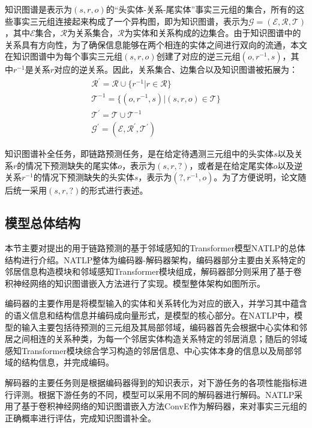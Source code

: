 知识图谱是表示为$(s,r,o)$的“头实体-关系-尾实体”事实三元组的集合，所有的这些事实三元组连接起来构成了一个异构图，即为知识图谱，表示为$\mathcal{G} = (\mathcal{E}, \mathcal{R}, \mathcal{T})$，其中$\mathcal{E}$集合，$\mathcal{R}$为关系集合，$\mathcal{R}$为实体和关系构成的边集合。由于知识图谱中的关系具有方向性，为了确保信息能够在两个相连的实体之间进行双向的流通，本文在知识图谱中为每个事实三元组$(s,r,o)$创建了对应的逆三元组$(o,r^{-1},s)$，其中$r^{-1}$是关系$r$对应的逆关系。因此，关系集合、边集合以及知识图谱被拓展为：
\begin{gather}
    \mathcal{R}^{\prime}=\mathcal{R}\cup\{ r^{-1} | r\in \mathcal{R}\}\\
    \mathcal{T}^{-1}= \{ (o,r^{-1},s)| (s,r,o)\in \mathcal{T}\}\\
    \mathcal{T}^{\prime} = \mathcal{T}\cup\mathcal{T}^{-1}\\
    \mathcal{G}^\prime = (\mathcal{E}, \mathcal{R}^\prime, \mathcal{T}^\prime)
\end{gather}

知识图谱补全任务，即链路预测任务，是在给定待遇测三元组中的头实体$s$以及关系$r$的情况下预测缺失的尾实体$o$，表示为$(s, r, ?)$，或者是在给定尾实体$o$以及逆关系$r^{-1}$的情况下预测缺失的头实体$s$，表示为$(?, r^{-1} , o) $。为了方便说明，论文随后统一采用$(s, r, ?)$的形式进行表述。


\subsection{模型总体结构}

本节主要对提出的用于链路预测的基于邻域感知的Transformer模型NATLP的总体结构进行介绍。NATLP整体为编码器-解码器架构，编码器部分主要由关系特定的邻居信息构造模块和邻域感知Transformer模块组成，解码器部分则采用了基于卷积神经网络的知识图谱嵌入方法进行了实现。模型整体架构如图所示。

编码器的主要作用是将模型输入的实体和关系转化为对应的嵌入，并学习其中蕴含的语义信息和结构信息并编码成向量形式，是模型的核心部分。在NATLP中，模型的输入主要包括待预测的三元组及其局部邻域，编码器首先会根据中心实体和邻居之间相连的关系种类，为每一个邻居实体构造关系特定的邻居消息；随后的邻域感知Transformer模块综合学习构造的邻居信息、中心实体本身的信息以及局部邻域的结构信息，并完成编码。

解码器的主要任务则是根据编码器得到的知识表示，对下游任务的各项性能指标进行评测。根据下游任务的不同，模型可以采用不同的解码器进行解码。NATLP采用了基于卷积神经网络的知识图谱嵌入方法ConvE作为解码器，来对事实三元组的正确概率进行评估，完成知识图谱补全。

